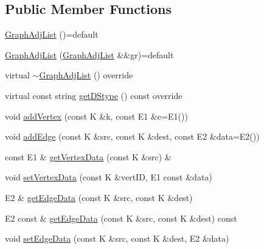 \subsection*{Public Member Functions}
\begin{DoxyCompactItemize}
\item 
\mbox{\hyperlink{classbridges_1_1datastructure_1_1_graph_adj_list_adb181bcfe104b8df8b3218ccf1b67ea5}{Graph\+Adj\+List}} ()=default
\item 
\mbox{\hyperlink{classbridges_1_1datastructure_1_1_graph_adj_list_ac175167a4447f3fc9c7f3e72f2f6a0b1}{Graph\+Adj\+List}} (\mbox{\hyperlink{classbridges_1_1datastructure_1_1_graph_adj_list}{Graph\+Adj\+List}} \&\&gr)=default
\item 
virtual \mbox{\hyperlink{classbridges_1_1datastructure_1_1_graph_adj_list_a17413dc27d7e60e1aa31cafa32082d12}{$\sim$\+Graph\+Adj\+List}} () override
\item 
virtual const string \mbox{\hyperlink{classbridges_1_1datastructure_1_1_graph_adj_list_adf1bfde5ec7192f3ee334695059f8fa6}{get\+D\+Stype}} () const override
\item 
void \mbox{\hyperlink{classbridges_1_1datastructure_1_1_graph_adj_list_a3bde76e49be4330da895103475f8430b}{add\+Vertex}} (const K \&k, const E1 \&e=E1())
\item 
void \mbox{\hyperlink{classbridges_1_1datastructure_1_1_graph_adj_list_a6573cc104657315196404bcef481d890}{add\+Edge}} (const K \&src, const K \&dest, const E2 \&data=E2())
\item 
const E1 \& \mbox{\hyperlink{classbridges_1_1datastructure_1_1_graph_adj_list_a3a9d3875e7f6eb0d4c3500c53957b9c1}{get\+Vertex\+Data}} (const K \&src) \&
\item 
void \mbox{\hyperlink{classbridges_1_1datastructure_1_1_graph_adj_list_ab87a30e6cbaf1d2db95dce705ebdd20f}{set\+Vertex\+Data}} (const K \&vert\+ID, E1 const \&data)
\item 
E2 \& \mbox{\hyperlink{classbridges_1_1datastructure_1_1_graph_adj_list_ab56ec428deb9a5bc4499f42bbd710b1a}{get\+Edge\+Data}} (const K \&src, const K \&dest)
\item 
E2 const  \& \mbox{\hyperlink{classbridges_1_1datastructure_1_1_graph_adj_list_a5c2cdffda7c983c3141ae36acc2b698d}{get\+Edge\+Data}} (const K \&src, const K \&dest) const
\item 
void \mbox{\hyperlink{classbridges_1_1datastructure_1_1_graph_adj_list_a21a7e957d60e18b540dc778b1d569372}{set\+Edge\+Data}} (const K \&src, const K \&dest, E2 \&data)
\item 

\end{DoxyCompactItemize}
